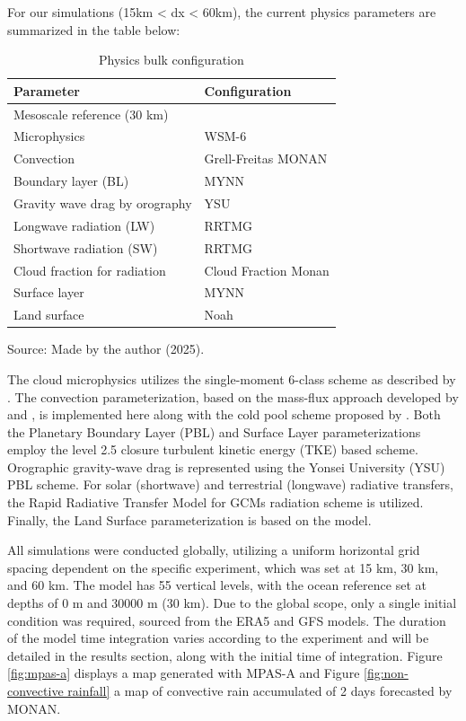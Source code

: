 For our simulations (15km < dx < 60km), the current physics parameters are summarized in the table below:

\begin{table}[htbp]
	\centering
	\caption{Physics bulk configuration}
	\label{tab:physics-config}
	\begin{tabular}{@{}ll@{}}
		\toprule
		\textbf{Parameter} & \textbf{Configuration} \\
		\midrule
		Mesoscale reference (30 km) & \\
		Microphysics & WSM-6 \\
		Convection & Grell-Freitas MONAN \\
		Boundary layer (BL) & MYNN \\
		Gravity wave drag by orography & YSU \\
		Longwave radiation (LW) & RRTMG \\
		Shortwave radiation (SW) & RRTMG \\
		Cloud fraction for radiation & Cloud Fraction Monan \\
		Surface layer & MYNN \\
		Land surface & Noah \\
		\bottomrule
	\end{tabular}
	
	\vspace{2mm}
	{\centering Source: Made by the author (2025).\par}
	
\end{table}

The cloud microphysics utilizes the single-moment 6-class scheme as described by . The convection parameterization, based on the mass-flux approach developed by  and , is implemented here along with the cold pool scheme proposed by . Both the Planetary Boundary Layer (PBL) and Surface Layer parameterizations employ the  level 2.5 closure turbulent kinetic energy (TKE) based scheme. Orographic gravity-wave drag is represented using the Yonsei University (YSU) PBL scheme. For solar (shortwave) and terrestrial (longwave) radiative transfers, the Rapid Radiative Transfer Model for GCMs \cite{iacono2008radiative} radiation scheme is utilized. Finally, the Land Surface parameterization is based on the  model.

All simulations were conducted globally, utilizing a uniform horizontal grid spacing dependent on the specific experiment, which was set at 15 km, 30 km, and 60 km. The model has 55 vertical levels, with the ocean reference set at depths of 0 m and 30000 m (30 km). Due to the global scope, only a single initial condition was required, sourced from the ERA5 and GFS models. The duration of the model time integration varies according to the experiment and will be detailed in the results section, along with the initial time of integration. Figure \ref{fig:mpas-a} displays a map generated with MPAS-A and Figure \ref{fig:non-convective rainfall} a map of convective rain accumulated of 2 days forecasted by MONAN.

